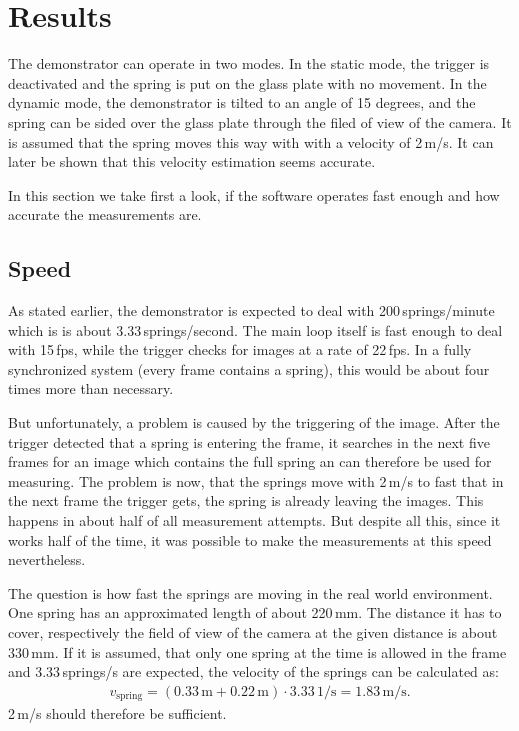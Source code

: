 \chapter{Results}
The demonstrator can operate in two modes.
In the static mode, the trigger is deactivated and the spring is put on the glass plate with no movement.
In the dynamic mode, the demonstrator is tilted to an angle of 15 degrees, and the spring can be sided over the glass plate through the filed of view of the camera.
It is assumed that the spring moves this way with with a velocity of 2\,m/s.
It can later be shown that this velocity estimation seems accurate.

In this section we take first a look, if the software operates fast enough and how accurate the measurements are.

\section{Speed}
As stated earlier, the demonstrator is expected to deal with 200\,springs/minute which is is about 3.33\,springs/second.
The main loop itself is fast enough to deal with 15\,fps, while the trigger checks for images at a rate of 22\,fps.
In a fully synchronized system (every frame contains a spring), this would be about four times more than necessary.

But unfortunately, a problem is caused by the triggering of the image.
After the trigger detected that a spring is entering the frame, it searches in the next five frames for an image which contains the full spring an can therefore be used for measuring.
The problem is now, that the springs move with 2\,m/s to fast that in the next frame the trigger gets, the spring is already leaving the images.
This happens in about half of all measurement attempts.
But despite all this, since it works half of the time, it was possible to make the measurements at this speed nevertheless.

The question is how fast the springs are moving in the real world environment.
One spring has an approximated length of about 220\,mm.
The distance it has to cover, respectively the field of view of the camera at the given distance is about 330\,mm.
If it is assumed, that only one spring at the time is allowed in the frame and 3.33\,springs/s are expected, the velocity of the springs can be calculated as:
\begin{align*}
	v_{\text{spring}}=(0.33\,\text{m}+0.22\,\text{m})\cdot 3.33\,1/\text{s}=1.83\,\text{m/s}.
\end{align*}
2\,m/s should therefore be sufficient.

